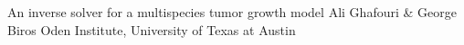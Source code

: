 \begin{talks}
\item\talk
{An inverse solver for a multispecies tumor growth model}
{Ali Ghafouri \& George Biros}
{Oden Institute, University of Texas at Austin}
\end{talks}

\room

